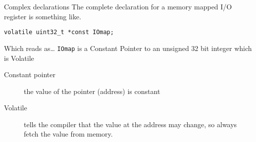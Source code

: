 \documentclass[xcolor=svgnames]{beamer}
\begin{document}
\begin{frame}[fragile]{Complex declarations}
    The complete declaration for a memory mapped I/O register is something like.
    \begin{tcolorbox}
        \begin{verbatim}
volatile uint32_t *const IOmap;
        \end{verbatim}
    \end{tcolorbox}
    Which reads as\ldots
    \texttt{IOmap} is a \alert{Constant} \alert{Pointer} to an \alert{unsigned 32 bit integer} which is \alert{Volatile}
    \begin{description}
        \item[Constant pointer] the value of the pointer (address) is constant
        \item[Volatile] tells the compiler that the value at the address may change, so always fetch the value from memory.
    \end{description}
\end{frame}
\end{document}
